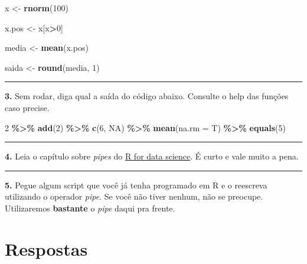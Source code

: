 \documentclass[
]{book}
\newenvironment{Shaded}{\begin{snugshade}}{\end{snugshade}}
\newcommand{\DataTypeTok}[1]{\textcolor[rgb]{0.13,0.29,0.53}{#1}}
\newcommand{\DecValTok}[1]{\textcolor[rgb]{0.00,0.00,0.81}{#1}}
\newcommand{\KeywordTok}[1]{\textcolor[rgb]{0.13,0.29,0.53}{\textbf{#1}}}
\newcommand{\NormalTok}[1]{#1}
\newcommand{\OperatorTok}[1]{\textcolor[rgb]{0.81,0.36,0.00}{\textbf{#1}}}
\newcommand{\OtherTok}[1]{\textcolor[rgb]{0.56,0.35,0.01}{#1}}
\newcommand{\StringTok}[1]{\textcolor[rgb]{0.31,0.60,0.02}{#1}}
\begin{document}
\begin{Shaded}
\begin{Highlighting}[]

\NormalTok{x <{-}}\StringTok{ }\KeywordTok{rnorm}\NormalTok{(}\DecValTok{100}\NormalTok{)}

\NormalTok{x.pos <{-}}\StringTok{ }\NormalTok{x[x}\OperatorTok{>}\DecValTok{0}\NormalTok{]}

\NormalTok{media <{-}}\StringTok{ }\KeywordTok{mean}\NormalTok{(x.pos)}

\NormalTok{saida <{-}}\StringTok{ }\KeywordTok{round}\NormalTok{(media, }\DecValTok{1}\NormalTok{)}
\end{Highlighting}
\end{Shaded}

\begin{center}\rule{0.5\linewidth}{0.5pt}\end{center}

\textbf{3.} Sem rodar, diga qual a saída do código abaixo. Consulte o help das funções caso precise.

\begin{Shaded}
\begin{Highlighting}[]
\DecValTok{2} \OperatorTok{\%>\%}
\StringTok{  }\KeywordTok{add}\NormalTok{(}\DecValTok{2}\NormalTok{) }\OperatorTok{\%>\%}
\StringTok{  }\KeywordTok{c}\NormalTok{(}\DecValTok{6}\NormalTok{, }\OtherTok{NA}\NormalTok{) }\OperatorTok{\%>\%}
\StringTok{  }\KeywordTok{mean}\NormalTok{(}\DataTypeTok{na.rm =}\NormalTok{ T) }\OperatorTok{\%>\%}
\StringTok{  }\KeywordTok{equals}\NormalTok{(}\DecValTok{5}\NormalTok{)}
\end{Highlighting}
\end{Shaded}

\begin{center}\rule{0.5\linewidth}{0.5pt}\end{center}

\textbf{4.} Leia o capítulo sobre \emph{pipes} do \href{http://r4ds.had.co.nz/pipes.html}{R for data science}. É curto e vale muito a pena.

\begin{center}\rule{0.5\linewidth}{0.5pt}\end{center}

\textbf{5.} Pegue algum script que você já tenha programado em R e o reescreva utilizando o operador \emph{pipe}. Se você não tiver nenhum, não se preocupe. Utilizaremos \textbf{bastante} o \emph{pipe} daqui pra frente.

\hypertarget{respostas-1}{%
\section{Respostas}\label{respostas-1}}
\end{document}
